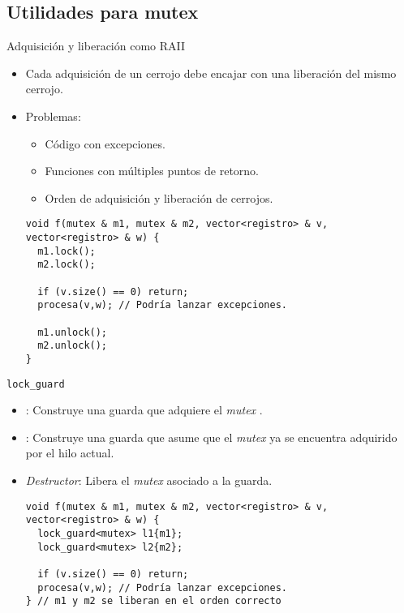 \subsection{Utilidades para mutex}

\begin{frame}[fragile]{Adquisición y liberación como RAII}
\begin{itemize}
  \item Cada adquisición de un cerrojo debe encajar con una liberación del mismo cerrojo.
  \item Problemas:
    \begin{itemize}
      \item Código con excepciones.
      \item Funciones con múltiples puntos de retorno.
      \item Orden de adquisición y liberación de cerrojos.
    \end{itemize}
\begin{lstlisting}
void f(mutex & m1, mutex & m2, vector<registro> & v, vector<registro> & w) {
  m1.lock();
  m2.lock();
  
  if (v.size() == 0) return;
  procesa(v,w); // Podría lanzar excepciones.
 
  m1.unlock();
  m2.unlock();
}
\end{lstlisting}
\end{itemize}
\end{frame}

\begin{frame}[fragile]{\texttt{lock\_guard}}
\begin{itemize}
  \item {}: Construye una guarda que adquiere el \emph{mutex} .
  \item {}: Construye una guarda que asume que el \emph{mutex}  ya
        se encuentra adquirido por el hilo actual.
  \item \emph{Destructor}: Libera el \emph{mutex} asociado a la guarda.
\begin{lstlisting}
void f(mutex & m1, mutex & m2, vector<registro> & v, vector<registro> & w) {
  lock_guard<mutex> l1{m1};
  lock_guard<mutex> l2{m2};
  
  if (v.size() == 0) return;
  procesa(v,w); // Podría lanzar excepciones.
} // m1 y m2 se liberan en el orden correcto
\end{lstlisting}
\end{itemize}
\end{frame}

